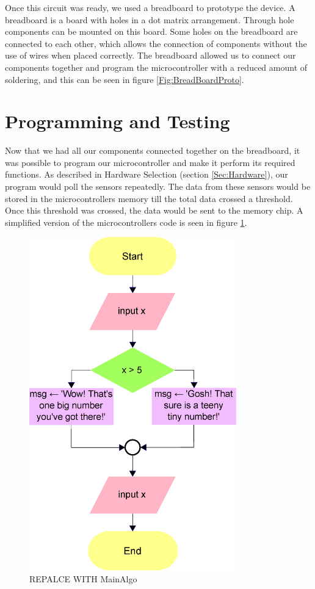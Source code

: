 Once this circuit was ready, we used a breadboard to prototype the device.
A breadboard is a board with holes in a dot matrix arrangement.
Through hole components can be mounted on this board.
Some holes on the breadboard are connected to each other,
which allows the connection of components without the use of wires when placed correctly.
The breadboard allowed us to connect our components together and program the microcontroller with a reduced amount of soldering, 
and this can be seen in figure \ref{Fig:BreadBoardProto}.

\section{Programming and Testing}
\label{Sec:Programming}
Now that we had all our components connected together on the breadboard,
it was possible to program our microcontroller and make it perform its required functions.
As described in Hardware Selection (section \ref{Sec:Hardware}),
our program would poll the sensors repeatedly.
The data from these sensors would be stored in the microcontrollers memory till the total data crossed a threshold.
Once this threshold was crossed, the data would be sent to the memory chip.
A simplified version of the microcontrollers code is seen in figure \ref{Fig:MainAlgo}.
\begin{figure}
\begin{center}
\includegraphics[width=0.8\textwidth]{images/MainAlgo.eps}
\caption{REPALCE WITH MainAlgo}
\label{Fig:MainAlgo}
\end{center}
\end{figure}
